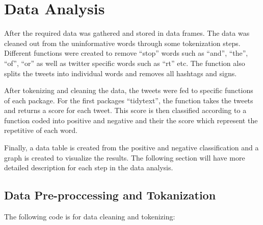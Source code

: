 \documentclass[
  12pt,
]{article}
\begin{document}
\hypertarget{data-analysis}{%
\section{Data Analysis}\label{data-analysis}}

After the required data was gathered and stored in data frames. The data
was cleaned out from the uninformative words through some tokenization
steps. Different functions were created to remove ``stop'' words such as
``and'', ``the'', ``of'', ``or'' as well as twitter specific words such
as ``rt'' etc. The function also splits the tweets into individual words
and removes all hashtags and signs.

After tokenizing and cleaning the data, the tweets were fed to specific
functions of each package. For the first packages ``tidytext'', the
function takes the tweets and returns a score for each tweet. This score
is then classified according to a function coded into positive and
negative and their the score which represent the repetitive of each
word.

Finally, a data table is created from the positive and negative
classification and a graph is created to visualize the results. The
following section will have more detailed description for each step in
the data analysis.

\hypertarget{data-pre-proccessing-and-tokanization}{%
\subsection{Data Pre-proccessing and
Tokanization}\label{data-pre-proccessing-and-tokanization}}

The following code is for data cleaning and tokenizing:
\end{document}
